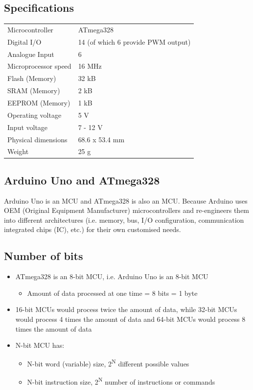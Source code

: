 \documentclass[11pt]{article}
\begin{document}
\subsection{Specifications}
\label{sec:orgd4c5826}
\begin{center}
\begin{tabular}{l|l}
Microcontroller & ATmega328\\
Digital I/O & 14 (of which 6 provide PWM output)\\
Analogue Input & 6\\
Microprocessor speed & 16 MHz\\
Flash (Memory) & 32 kB\\
SRAM (Memory) & 2 kB\\
EEPROM (Memory) & 1 kB\\
Operating voltage & 5 V\\
Input voltage & 7 - 12 V\\
Physical dimensions & 68.6 x 53.4 mm\\
Weight & 25 g\\
\end{tabular}
\end{center}
\subsection{Arduino Uno and ATmega328}
\label{sec:org8ca2090}
Arduino Uno is an MCU and ATmega328 is also an MCU. Because Arduino uses OEM (Original Equipment Manufacturer) microcontrollers and re-engineers them into different architectures (i.e. memory, bus, I/O configuration, communication integrated chips (IC), etc.) for their own customised needs.
\subsection{Number of bits}
\label{sec:org9641b02}
\begin{itemize}
\item ATmega328 is an 8-bit MCU, i.e. Arduino Uno is an 8-bit MCU
\begin{itemize}
\item Amount of data processed at one time = 8 bits = 1 byte
\end{itemize}
\item 16-bit MCUs would process twice the amount of data, while 32-bit MCUs would process 4 times the amount of data and 64-bit MCUs would process 8 times the amount of data
\item N-bit MCU has:
\begin{itemize}
\item N-bit word (variable) size, 2\textsuperscript{N} different possible values
\item N-bit instruction size, 2\textsuperscript{N} number of instructions or commands
\end{itemize}
\end{itemize}
\end{document}
